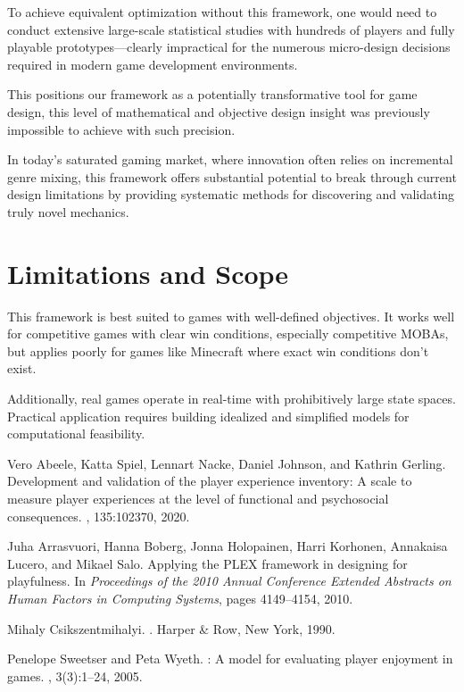 \documentclass{article}
\begin{document}
To achieve equivalent optimization without this framework, one would need to conduct extensive large-scale statistical studies with hundreds of players and fully playable prototypes---clearly impractical for the numerous micro-design decisions required in modern game development environments.

This positions our framework as a potentially transformative tool for game design, this level of mathematical and objective design insight was previously impossible to achieve with such precision.

In today's saturated gaming market, where innovation often relies on incremental genre mixing, this framework offers substantial potential to break through current design limitations by providing systematic methods for discovering and validating truly novel mechanics.

\section{Limitations and Scope}

This framework is best suited to games with well-defined objectives. It works well for competitive games with clear win conditions, especially competitive MOBAs, but applies poorly for games like Minecraft where exact win conditions don't exist.

Additionally, real games operate in real-time with prohibitively large state spaces. Practical application requires building idealized and simplified models for computational feasibility.

\begin{thebibliography}{1}

Vero Abeele, Katta Spiel, Lennart Nacke, Daniel Johnson, and Kathrin Gerling.
\newblock Development and validation of the player experience inventory: A scale to measure player experiences at the level of functional and psychosocial consequences.
, 135:102370, 2020.

Juha Arrasvuori, Hanna Boberg, Jonna Holopainen, Harri Korhonen, Annakaisa Lucero, and Mikael Salo.
\newblock Applying the {PLEX} framework in designing for playfulness.
\newblock In {\em Proceedings of the 2010 Annual Conference Extended Abstracts on Human Factors in Computing Systems}, pages 4149--4154, 2010.

Mihaly Csikszentmihalyi.
.
\newblock Harper \& Row, New York, 1990.

Penelope Sweetser and Peta Wyeth.
: A model for evaluating player enjoyment in games.
, 3(3):1--24, 2005.

\end{thebibliography}
\end{document}

